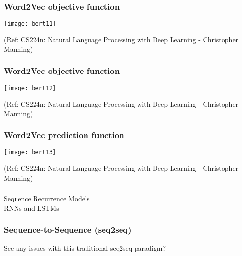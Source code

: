 \begin{frame}[fragile]\frametitle{Word2Vec objective function}


\begin{center}
\texttt{[image: bert11]}
\end{center}	

{\tiny (Ref: CS224n: Natural Language Processing with Deep Learning - Christopher Manning)}

\end{frame}

\begin{frame}[fragile]\frametitle{Word2Vec objective function}


\begin{center}
\texttt{[image: bert12]}
\end{center}	

{\tiny (Ref: CS224n: Natural Language Processing with Deep Learning - Christopher Manning)}

\end{frame}

\begin{frame}[fragile]\frametitle{Word2Vec prediction function}


\begin{center}
\texttt{[image: bert13]}
\end{center}	

{\tiny (Ref: CS224n: Natural Language Processing with Deep Learning - Christopher Manning)}

\end{frame}

\begin{frame}[fragile]\frametitle{}
\begin{center}
{\Large Sequence Recurrence Models \\ \small RNNs and LSTMs}
\end{center}
\end{frame}


\begin{frame}[fragile]\frametitle{Sequence-to-Sequence (seq2seq)}

\begin{center}
See any issues with this traditional seq2seq paradigm?
\end{center}	

\end{frame}


